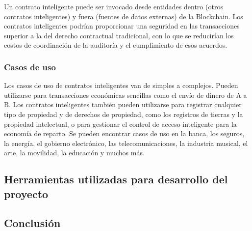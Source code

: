 \vspace{5mm}

\noindent Un contrato inteligente puede ser invocado desde entidades dentro (otros contratos inteligentes) y fuera 
(fuentes de datos externas) de la Blockchain. Los contratos inteligentes podrían proporcionar una seguridad en las 
transacciones superior a la del derecho contractual tradicional, con lo que se reducirían los costos de coordinación 
de la auditoría y el cumplimiento de esos acuerdos. 

\subsubsection*{Casos de uso}

Los casos de uso de contratos inteligentes van de simples a complejos. Pueden utilizarse para transacciones económicas 
sencillas como el envío de dinero de A a B. Los contratos inteligentes también pueden utilizarse para registrar 
cualquier tipo de propiedad y de derechos de propiedad, como los registros de tierras y la propiedad intelectual, o para 
gestionar el control de acceso inteligente para la economía de reparto. Se pueden encontrar casos de uso en la banca, 
los seguros, la energía, el gobierno electrónico, las telecomunicaciones, la industria musical, el arte, la movilidad, 
la educación y muchos más.

\subsection{Herramientas utilizadas para desarrollo del proyecto}

\subsection{Conclusión}

\newpage